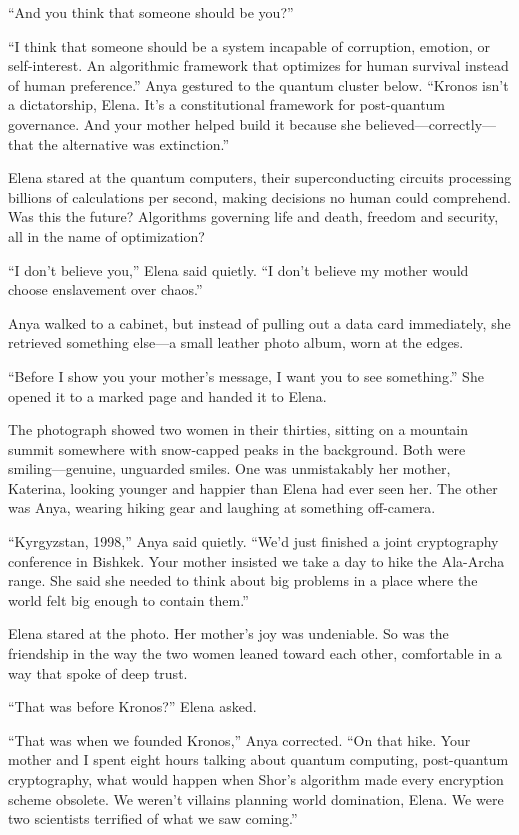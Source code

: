 \documentclass[12pt,letterpaper]{book}
\begin{document}
``And you think that someone should be you?''

``I think that someone should be a system incapable of corruption, emotion, or self-interest. An algorithmic framework that optimizes for human survival instead of human preference.'' Anya gestured to the quantum cluster below. ``Kronos isn't a dictatorship, Elena. It's a constitutional framework for post-quantum governance. And your mother helped build it because she believed---correctly---that the alternative was extinction.''

Elena stared at the quantum computers, their superconducting circuits processing billions of calculations per second, making decisions no human could comprehend. Was this the future? Algorithms governing life and death, freedom and security, all in the name of optimization?

``I don't believe you,'' Elena said quietly. ``I don't believe my mother would choose enslavement over chaos.''

Anya walked to a cabinet, but instead of pulling out a data card immediately, she retrieved something else---a small leather photo album, worn at the edges.

``Before I show you your mother's message, I want you to see something.'' She opened it to a marked page and handed it to Elena.

The photograph showed two women in their thirties, sitting on a mountain summit somewhere with snow-capped peaks in the background. Both were smiling---genuine, unguarded smiles. One was unmistakably her mother, Katerina, looking younger and happier than Elena had ever seen her. The other was Anya, wearing hiking gear and laughing at something off-camera.

``Kyrgyzstan, 1998,'' Anya said quietly. ``We'd just finished a joint cryptography conference in Bishkek. Your mother insisted we take a day to hike the Ala-Archa range. She said she needed to think about big problems in a place where the world felt big enough to contain them.''

Elena stared at the photo. Her mother's joy was undeniable. So was the friendship in the way the two women leaned toward each other, comfortable in a way that spoke of deep trust.

``That was before Kronos?'' Elena asked.

``That was when we founded Kronos,'' Anya corrected. ``On that hike. Your mother and I spent eight hours talking about quantum computing, post-quantum cryptography, what would happen when Shor's algorithm made every encryption scheme obsolete. We weren't villains planning world domination, Elena. We were two scientists terrified of what we saw coming.''
\end{document}
